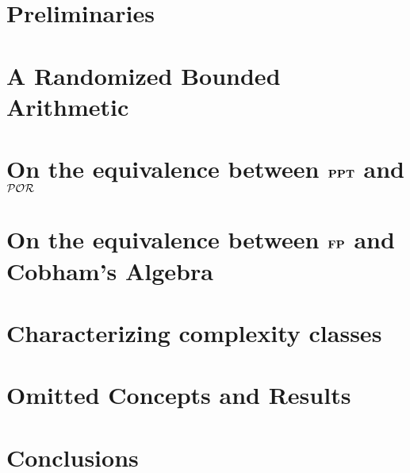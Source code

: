 \documentclass[10pt]{book}
\begin{document}
\chapter{Preliminaries}
\label{chap:preliminaries}


\chapter{A Randomized Bounded Arithmetic}
\label{chap:RBA}





\chapter{On the equivalence between $\mathbf{PPT}$ and $\mathcal{POR}$}
\label{chap:sfptopor}



%



\chapter{On the equivalence between $\mathbf{FP}$ and Cobham's Algebra}
\label{chap:cobham}

%

\chapter{Characterizing complexity classes}
\label{chap:characterization}


\chapter{Omitted Concepts and Results}
\label{chap:tech}





\chapter{Conclusions}


\printbibliography
\end{document}

